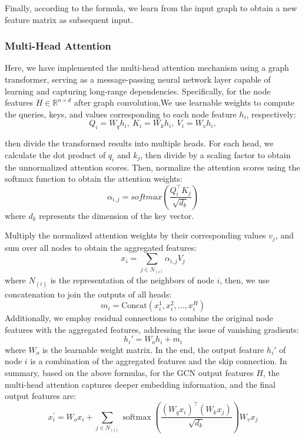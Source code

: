 \documentclass[lettersize,journal]{IEEEtran}
\begin{document}
Finally, according to the formula, we learn from the input graph to obtain a new feature matrix as subsequent input.

\subsubsection{\textbf{Multi-Head Attention}}
Here, we have implemented the multi-head attention\cite{cordonnier2020multi} mechanism using a graph transformer\cite{shi2021maskedlabelpredictionunified}, serving as a message-passing neural network layer capable of learning and capturing long-range dependencies. Specifically, for the node features \(H \in \mathbb{R}^{n \times d} \) after graph convolution,We use learnable weights to compute the queries, keys, and values corresponding to each node feature \( h_i \), respectively:
\begin{equation}
	Q_i = W_qh_i, \ K_i = W_kh_i, \ V_i = W_vh_i, 
\end{equation}

then divide the transformed results into multiple heads. For each head, we calculate the dot product of \( q_i \) and \( k_j \), then divide by a scaling factor to obtain the unnormalized attention scores. Then, normalize the attention scores using the softmax function\cite{liu2017largemarginsoftmaxlossconvolutional} to obtain the attention weights:
\begin{equation}
 \alpha_{i,j} = softmax(\frac{{Q}_i^\top {K}_j}{\sqrt{d_k}})
\end{equation}
where \( d_k \) represents the dimension of the key vector. 

Multiply the normalized attention weights by their corresponding values \({v}_j\), and sum over all nodes to obtain the aggregated features:
\begin{equation}
	{x}_i = \sum_{j \in {N}_{(i)}} \alpha_{i,j} {V}_j
\end{equation}
where \({N}_{(i)}\) is the representation of the neighbors of node \(i\),
then, we use concatenation to join the outputs of all heads:
\begin{equation}
{m}_i = \text{Concat}({x}_i^1, {x}_i^2, ..., {x}_i^H)
\end{equation}
Additionally, we employ residual connections\cite{szegedy2017inception} to combine the original node features with the aggregated features, addressing the issue of vanishing gradients:
\begin{equation}
	{h}_i' = {W}_o {h}_i + {m}_i
\end{equation}
where \({W}_o\) is the learnable weight matrix. In the end, the output feature \({h}_i'\) of node \(i\) is a combination of the aggregated features and the skip connection.
In summary, based on the above formulas, for the GCN output features \( H \), the multi-head attention captures deeper embedding information, and the final output features are:
\begin{equation}
		x_{i}^{\prime} = W_{o}x_{i} + \sum_{j \in {N}_(i)} \operatorname{softmax}\left(\frac{\left(W_{q} x_{i}\right)^{\top}\left(W_{k} x_{j}\right)}{\sqrt{d_{k}}}\right)W_{v}x_{j}
\end{equation}
\end{document}
